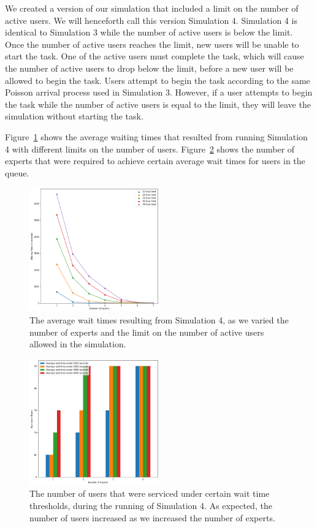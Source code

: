 We created a version of our simulation that included a limit on the number of
active users.
We will henceforth call this version Simulation 4.
Simulation 4 is identical to Simulation 3 while the number of active users is
below the limit.
Once the number of active users reaches the limit, new users will be unable to
start the task.
One of the active users must complete the task, which will cause the number of
active users to drop below the limit, before a new user will be allowed to begin
the task.
Users attempt to begin the task according to the same Poisson arrival process
used in Simulation 3.
However, if a user attempts to begin the task while the number of active users
is equal to the limit, they will leave the simulation without starting the task.

Figure~\ref{fig:vary_num_users} shows the average waiting times that resulted
from running Simulation 4 with different limits on the number of users.
Figure~\ref{fig:vary_num_users2} shows the number of experts that were required
to achieve certain average wait times for users in the queue.

\begin{figure}[h]
  \includegraphics[width=0.5\textwidth]{figures/montecarlo/vary_num_users.png}
  \caption{
    The average wait times resulting from Simulation 4, as we varied the number
    of experts and the limit on the number of active users allowed in the
    simulation.
  }\label{fig:vary_num_users}
\end{figure}

\begin{figure}[h]
  \includegraphics[width=0.5\textwidth]{figures/montecarlo/vary_num_users2.png}
  \caption{
    The number of users that were serviced under certain wait time thresholds,
    during the running of Simulation 4.
    As expected, the number of users increased as we increased the number of
    experts.
  }\label{fig:vary_num_users2}
\end{figure}
